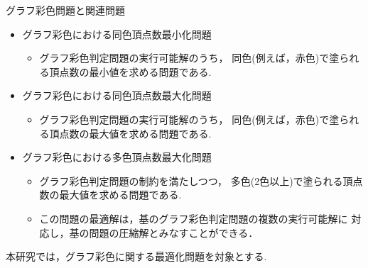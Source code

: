 \documentclass[dvipdfmx,11pt]{beamer}
\begin{document}
\begin{frame}{グラフ彩色問題と関連問題}
 \begin{itemize}
  \item \alert{グラフ彩色における同色頂点数最小化問題}
        \begin{itemize}
         \item グラフ彩色判定問題の実行可能解のうち，
	       同色(例えば，赤色)で塗られる頂点数の最小値を求める問題である.
        \end{itemize}
  \item \alert{グラフ彩色における同色頂点数最大化問題}
        \begin{itemize}
         \item グラフ彩色判定問題の実行可能解のうち，
	       同色(例えば，赤色)で塗られる頂点数の最大値を求める問題である.
        \end{itemize}
  \item \alert{グラフ彩色における多色頂点数最大化問題}
        \begin{itemize}
         \item グラフ彩色判定問題の制約を満たしつつ，
	       多色(2色以上)で塗られる頂点数の最大値を求める問題である.
         \item この問題の最適解は，基のグラフ彩色判定問題の複数の実行可能解に
               対応し，基の問題の圧縮解とみなすことができる．
        \end{itemize}
 \end{itemize}

 \begin{alertblock}{}
  \centering
  本研究では，グラフ彩色に関する最適化問題を対象とする.%
 \end{alertblock}
\end{frame}
\end{document}
